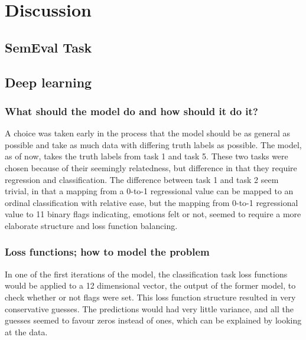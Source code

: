 
\section{Discussion}

\subsection{SemEval Task}

\subsection{Deep learning}

\subsubsection*{What should the model do and how should it do it?}
A choice was taken early in the process that the model should be as general as possible and take as much data with differing truth labels as possible. The model, as of now, takes the truth labels from task 1 and task 5. These two tasks were chosen because of their seemingly relatedness, but difference in that they require regression and classification. The difference between task 1 and task 2 seem trivial, in that a mapping from a 0-to-1 regressional value can be mapped to an ordinal classification with relative ease, but the mapping from 0-to-1 regressional value to 11 binary flags indicating, emotions felt or not, seemed to require a more elaborate structure and loss function balancing.\\

\subsubsection*{Loss functions; how to model the problem}
In one of the first iterations of the model, the classification task loss functions would be applied to a 12 dimensional vector, the output of the former model, to check whether or not flags were set. This loss function structure resulted in very conservative guesses. The predictions would had very little variance, and all the guesses seemed to favour zeros instead of ones, which can be explained by looking at the data.\\

